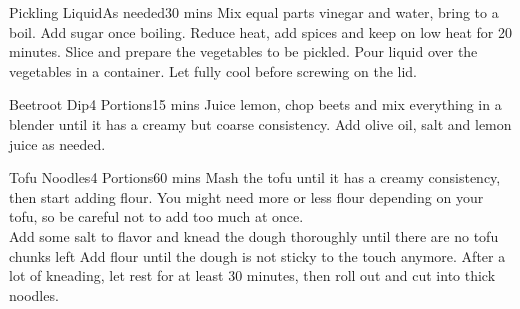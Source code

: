 \documentclass[]{article}
\begin{document}
\begin{center}
	\begin{recipe}{Pickling Liquid}{As needed}{30 mins}
		Mix equal parts vinegar and water, bring to a boil.
		Add sugar once boiling.
		Reduce heat, add spices and keep on low heat for 20 minutes.
		\newstep
		\freeform Slice and prepare the vegetables to be pickled. 
		Pour liquid over the vegetables in a container. 
		Let fully cool before screwing on the lid.
		\freeform\hrulefill
	\end{recipe}
	
	\begin{recipe}{Beetroot Dip}{4 Portions}{15 mins}
		Juice lemon, chop beets and mix everything in a blender until it has a creamy but coarse consistency. 
		Add olive oil, salt and lemon juice as needed.
		\freeform\hrulefill
	\end{recipe}
	
	\begin{recipe}{Tofu Noodles}{4 Portions}{60 mins}
		\freeform Mash the tofu until it has a creamy consistency, then start adding flour. 
		You might need more or less flour depending on your tofu, so be careful not to add too much at once. \\
		Add some salt to flavor and knead the dough thoroughly until there are no tofu chunks left
		Add flour until the dough is not sticky to the touch anymore. 
		After a lot of kneading, let rest for at least 30 minutes, then roll out and cut into thick noodles. 
		\freeform\hrulefill
	\end{recipe}
	

\end{center}
\end{document}
